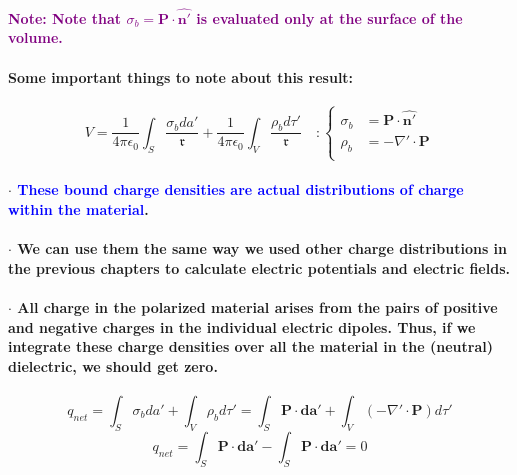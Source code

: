 \documentclass{article}
\begin{document}
\paragraph{\textcolor{purple}{Note: Note that $\sigma_b =\boldsymbol{P}\cdot \hat{\boldsymbol{n'}}$ is evaluated only at the surface of the volume.}}
\paragraph{Some important things to note about this result:}
\begin{equation*}
    V=\frac{1}{4\pi\epsilon_0}\int_S \frac{\sigma_b da'}{\mathfrak{r}}+\frac{1}{4\pi\epsilon_0}\int_V\frac{\rho_b d\tau'}{\mathfrak{r}}\quad:\begin{cases}
        \sigma_b & =\boldsymbol{P}\cdot \hat{\boldsymbol{n'}}\\
        \rho_b & =-\nabla'\cdot\boldsymbol{P}\\
    \end{cases}
\end{equation*}
\paragraph{\indent $\cdot$ \textcolor{blue}{These bound charge densities are actual distributions of charge within the material}.}
\paragraph{\indent $\cdot$ We can use them the same way we used other charge distributions in the previous chapters to calculate electric potentials and electric fields.}
\paragraph{\indent $\cdot$ All charge in the polarized material arises from the pairs of positive and negative charges in the individual electric dipoles. Thus, if we integrate these charge densities over all the material in the (neutral) dielectric, we should get zero.}
\begin{equation*}
    q_{net}=\int_S \sigma_b da'+\int_V \rho_b d\tau'=\int_S \boldsymbol{P}\cdot\boldsymbol{da'}+\int_V (-\nabla'\cdot \boldsymbol{P})d\tau'
\end{equation*}
\begin{equation*}
    q_{net}=\int_S \boldsymbol{P}\cdot\boldsymbol{da'}-\int_S \boldsymbol{P}\cdot\boldsymbol{da'}=0
\end{equation*}
\end{document}
